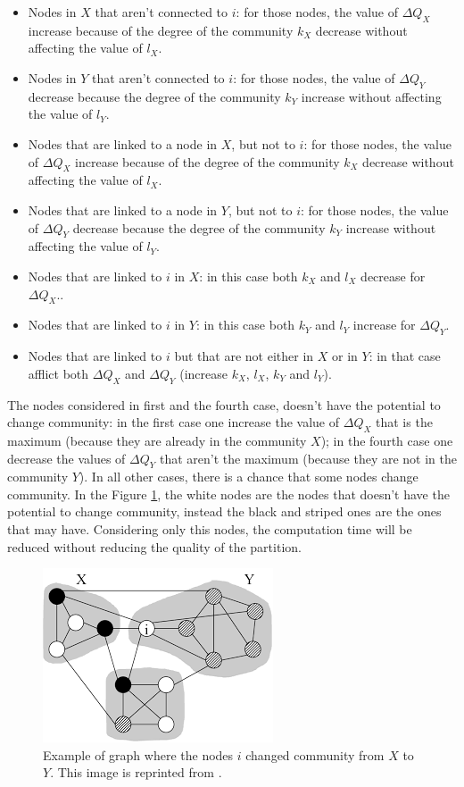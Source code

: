 \begin{itemize}
	\item Nodes in $X$ that aren't connected to $i$:  for those nodes, the value of $\Delta Q_X$ increase because of the degree of the community $k_X$ decrease without affecting the value of $l_X$.
	\item Nodes in $Y$ that aren't connected to $i$: for those nodes, the value of $\Delta Q_Y$ decrease because the degree of the community $k_Y$ increase without affecting the value of $l_Y$.
	\item  Nodes that are linked to a node in $X$, but not to $i$: for those nodes, the value of $\Delta Q_X$ increase because of the degree of the community $k_X$ decrease without affecting the value of $l_X$.
	\item  Nodes that are linked to a node in $Y$, but not to $i$: for those nodes, the value of $\Delta Q_Y$ decrease because the degree of the community $k_Y$ increase without affecting the value of $l_Y$.
	\item Nodes that are linked to $i$ in $X$:
	in this case both $k_X$ and $l_X$ decrease for $\Delta Q_X$..
	\item Nodes that are linked to $i$ in $Y$:
	in this case both $k_Y$ and $l_Y$ increase for $\Delta Q_Y$.
	\item Nodes that are linked to $i$ but that are not either in $X$ or in $Y$:
	in that case afflict both $\Delta Q_X$ and $\Delta Q_Y$ (increase $k_X$, $l_X$, $k_Y$ and $l_Y$).
\end{itemize} 
The nodes considered in first and the fourth case, doesn't have the potential to change community: in the first case one increase the value of $\Delta Q_X$ that is the maximum (because they are already in the community $X$); in the fourth case one decrease the values of $\Delta Q_Y$ that aren't the maximum (because they are not in the community $Y$). In all other cases, there is a chance that some nodes change community. In the Figure \ref{fig:pruning}, the white nodes are the nodes that doesn't have the potential to change community, instead the black and striped ones are the ones that may have. Considering only this nodes, the computation time will be reduced without reducing the quality of the partition.
\begin{figure}
	\centering
	\includegraphics[width=0.7\linewidth]{0-resources/pruning}
	\caption{Example of graph where the nodes $i$ changed community from $X$ to $Y$. This image is reprinted from \cite{pruning}.}
	\label{fig:pruning}
\end{figure}\\
